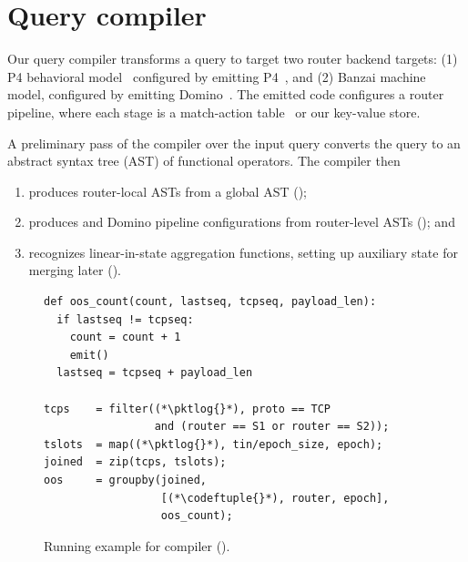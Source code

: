 \section{Query compiler}
\label{sec:compiler}

Our query compiler transforms a \TheSystem query to target two router backend
targets: (1) P4 behavioral model~\cite{p4-bmv2} configured by emitting
P4~\cite{p4}, and (2) Banzai machine model, configured by emitting
Domino~\cite{domino_sigcomm}. The emitted code configures a router pipeline,
where each stage is a match-action table~\cite{openflow} or our key-value store.

A preliminary pass of the compiler over the input query converts the query to an
abstract syntax tree (AST) of functional operators. The compiler then
\begin{enumerate}
\item produces router-local ASTs from a global AST
  ();
\item produces \pfs and Domino pipeline configurations from router-level ASTs
  (); and
\item recognizes linear-in-state aggregation functions, setting up
  auxiliary state for merging later ().
\end{enumerate}

\begin{figure}[!t]{
\figcodesize
\begin{lstlisting}
def oos_count(count, lastseq, tcpseq, payload_len):
  if lastseq != tcpseq:
    count = count + 1
    emit()
  lastseq = tcpseq + payload_len

tcps    = filter((*\pktlog{}*), proto == TCP
                 and (router == S1 or router == S2));
tslots  = map((*\pktlog{}*), tin/epoch_size, epoch);
joined  = zip(tcps, tslots);
oos     = groupby(joined,
                  [(*\codeftuple{}*), router, epoch],
                  oos_count);
\end{lstlisting}
}
\caption{Running example for \TheSystem compiler ().}
\label{fig:running-example-code}
\end{figure}

